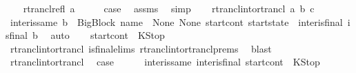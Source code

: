 \begin{isabellebody}
\ \ \isamarkupfalse%
\ {\isacharparenleft}{\kern0pt}rtrancl{\isacharunderscore}{\kern0pt}refl\ a{\isacharparenright}{\kern0pt}\isanewline
\ \ \isamarkupfalse%
\ \isamarkupfalse%
\ {\isacharquery}{\kern0pt}case\ \isamarkupfalse%
\ assms\ \isamarkupfalse%
\ simp\isanewline
{}\isamarkupfalse%
\isanewline
\ \ \isamarkupfalse%
\ {\isacharparenleft}{\kern0pt}rtrancl{\isacharunderscore}{\kern0pt}into{\isacharunderscore}{\kern0pt}rtrancl\ a\ b\ c{\isacharparenright}{\kern0pt}\isanewline
\ \ \isamarkupfalse%
\ \isamarkupfalse%
\ inter{\isacharunderscore}{\kern0pt}is{\isacharunderscore}{\kern0pt}same{\isacharcolon}{\kern0pt}\ {\isachardoublequoteopen}b\ {\isacharequal}{\kern0pt}\ {\isacharparenleft}{\kern0pt}BigBlock\ name\ {\isacharbrackleft}{\kern0pt}{\isacharbrackright}{\kern0pt}\ None\ None{\isacharcomma}{\kern0pt}\ start{\isacharunderscore}{\kern0pt}cont{\isacharcomma}{\kern0pt}\ start{\isacharunderscore}{\kern0pt}state{\isacharparenright}{\kern0pt}{\isachardoublequoteclose}\ \ inter{\isacharunderscore}{\kern0pt}is{\isacharunderscore}{\kern0pt}final{\isacharcolon}{\kern0pt}\ {\isachardoublequoteopen}is{\isacharunderscore}{\kern0pt}final\ b{\isachardoublequoteclose}\ \isamarkupfalse%
\ auto\isanewline
\ \ \isamarkupfalse%
\ {\isachardoublequoteopen}start{\isacharunderscore}{\kern0pt}cont\ {\isacharequal}{\kern0pt}\ KStop{\isachardoublequoteclose}\ \isamarkupfalse%
\ rtrancl{\isacharunderscore}{\kern0pt}into{\isacharunderscore}{\kern0pt}rtrancl{\isacharparenleft}{\kern0pt}{}{\isacharparenright}{\kern0pt}\ is{\isacharunderscore}{\kern0pt}final{\isachardot}{\kern0pt}elims{\isacharparenleft}{\kern0pt}{}{\isacharparenright}{\kern0pt}\ rtrancl{\isacharunderscore}{\kern0pt}into{\isacharunderscore}{\kern0pt}rtrancl{\isachardot}{\kern0pt}prems{\isacharparenleft}{\kern0pt}{}{\isacharparenright}{\kern0pt}\ \isamarkupfalse%
\ blast\isanewline
\ \ \isamarkupfalse%
\ rtrancl{\isacharunderscore}{\kern0pt}into{\isacharunderscore}{\kern0pt}rtrancl{\isacharparenleft}{\kern0pt}{}{\isacharparenright}{\kern0pt}\ \isamarkupfalse%
\ {\isacharquery}{\kern0pt}case\isanewline
\ \ \ \ \isamarkupfalse%
\ inter{\isacharunderscore}{\kern0pt}is{\isacharunderscore}{\kern0pt}same\ inter{\isacharunderscore}{\kern0pt}is{\isacharunderscore}{\kern0pt}final\ {\isacartoucheopen}start{\isacharunderscore}{\kern0pt}cont\ {\isacharequal}{\kern0pt}\ KStop{\isacartoucheclose}\isanewline

\end{isabellebody}
